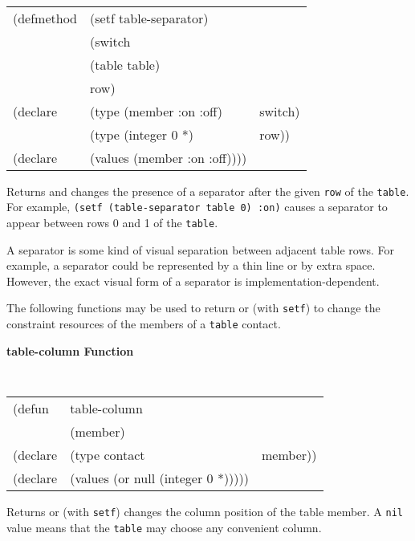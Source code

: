 {\samepage
\begin{flushright} \parbox[t]{6.125in}{
\tt
\begin{tabular}{lll}
\raggedright
(defmethod & (setf table-separator) & \\
         & (switch \\
         & (table table)\\
         & row) \\
(declare &(type (member :on :off) & switch)\\
         &(type (integer 0 *) & row))\\
(declare &(values (member :on :off))))
\end{tabular}
\rm
}
\end{flushright}}



\begin{flushright} \parbox[t]{6.125in}{
Returns and changes the presence of a separator after the given {\tt row} of the
{\tt table}. For example, {\tt (setf (table-separator table 0) :on)} causes a
separator to appear between rows 0 and 1 of the {\tt table}.

A separator is some kind of visual separation between adjacent table
rows. For example, a separator could be represented by a thin line or by extra
space. However, the exact visual form of a separator is
implementation-dependent.

}\end{flushright}
	  

The
following functions may be used to return or (with {\tt setf}) to change
the constraint resources of the members of a {\tt table} contact.


{\samepage
{\large {\bf table-column \hfill Function}}
\begin{flushright} \parbox[t]{6.125in}{
\tt
\begin{tabular}{lll}
\raggedright
(defun & table-column & \\
& (member) \\
(declare &(type contact & member))\\
(declare & (values (or null (integer 0 *)))))
\end{tabular}
\rm

}\end{flushright}}

\begin{flushright} \parbox[t]{6.125in}{
Returns or (with {\tt setf}) changes the column position of the table member.
A {\tt nil} value means that the {\tt table} may choose any
convenient column.}\end{flushright}

